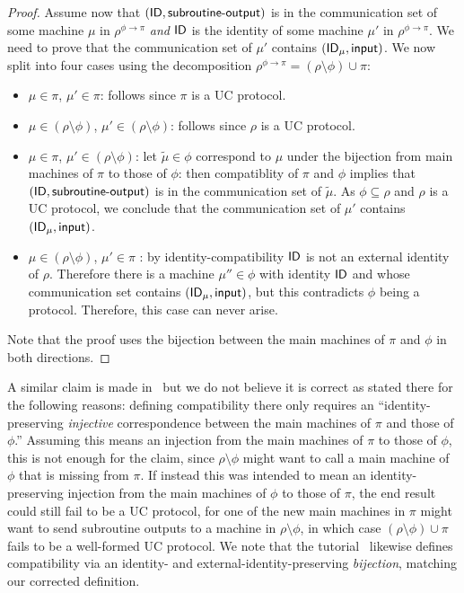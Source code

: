 \begin{proof}
Assume now that  $(\mathsf{ID},\mathsf{subroutine\textsf{-}output})$ is in the communication set of some machine $\mu$ in $\rho^{\phi\to\pi}$ \emph{and} $\mathsf{ID}$ is the identity of some machine $\mu'$ in $\rho^{\phi\to\pi}$. We need to prove that the communication set of $\mu'$ contains $(\mathsf{ID}_\mu,\mathsf{input})$.  We now split into four cases using the decomposition $\rho^{\phi\to\pi}=(\rho\setminus\phi)\cup\pi$:
\begin{itemize}
    \item $\mu\in \pi$, $\mu' \in \pi$: follows since $\pi$ is a UC protocol.
    \item $\mu\in (\rho\setminus\phi)$, $\mu' \in (\rho\setminus\phi)$: follows since $\rho$ is a UC protocol.
    \item $\mu\in \pi$, $\mu' \in (\rho\setminus\phi)$: let $\tilde{\mu}\in\phi$ correspond to $\mu$ under the bijection from  main machines of $\pi$ to those of $\phi$: then compatiblity of $\pi$ and $\phi$ implies that $(\mathsf{ID},\mathsf{subroutine\textsf{-}output})$ is in the communication set of $\tilde{\mu}$. As $\phi\subseteq \rho$ and $\rho$ is a UC protocol, we conclude that the communication set of $\mu'$ contains $(\mathsf{ID}_\mu,\mathsf{input})$.
    \item $\mu\in (\rho\setminus\phi)$, $\mu' \in \pi$ :
    by identity-compatibility $\mathsf{ID}$ is not an external identity of $\rho$. Therefore there is a machine $\mu''\in \phi$  with identity $\mathsf{ID}$ and whose communication set contains $(\mathsf{ID}_\mu,\mathsf{input})$, but this contradicts $\phi$ being a protocol. Therefore, this case can never arise.\qedhere
\end{itemize}
Note that the proof uses the bijection between the main machines of $\pi$ and $\phi$ in both directions. 
\end{proof}

A similar claim is made in~\cite[Section~2]{Can20} but we do not believe it is correct as stated there for the following reasons:
defining compatibility there only requires an ``identity-preserving \emph{injective} correspondence between the main machines of $\pi$ and those of $\phi$.'' Assuming this means an injection from the main machines of $\pi$ to those of $\phi$, this is not enough for the claim, since $\rho\setminus\phi$ might want to call a main machine of $\phi$ that is missing from $\pi$. 
If instead this was intended to mean an identity-preserving injection from the main machines of $\phi$ to those of $\pi$, the end result could still fail to be a UC protocol, for one of the new main machines in $\pi$ might want to send subroutine outputs to a machine in $\rho\setminus\phi$, in which case $(\rho\setminus\phi) \cup \pi$ fails to be a well-formed UC protocol. We note that the tutorial~\cite{Can25:tutorial} likewise defines compatibility via an identity- and external-identity-preserving \emph{bijection}, matching our corrected definition.

